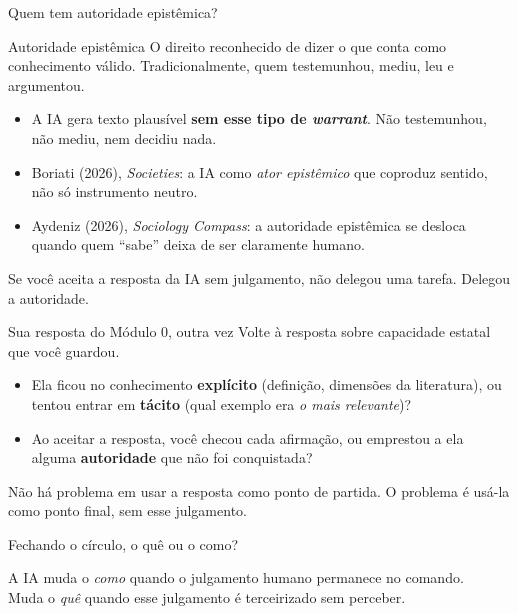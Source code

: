 \documentclass[11pt,aspectratio=169,t]{beamer}
\begin{document}
\begin{frame}{Quem tem autoridade epistêmica?}
  \footnotesize
  \begin{block}{Autoridade epistêmica}
    O direito reconhecido de dizer o que conta como conhecimento válido. Tradicionalmente, quem testemunhou, mediu, leu e argumentou.
  \end{block}
  \pause
  \vspace{0.1cm}
  \begin{itemize}
    \item A IA gera texto plausível \textbf{sem esse tipo de \textit{warrant}}. Não testemunhou, não mediu, nem decidiu nada.
    \pause
    \item Boriati (2026), \textit{Societies}: a IA como \textit{ator epistêmico} que coproduz sentido, não só instrumento neutro.
    \pause
    \item Aydeniz (2026), \textit{Sociology Compass}: a autoridade epistêmica se desloca quando quem ``sabe'' deixa de ser claramente humano.
  \end{itemize}
  \pause
  \vspace{0.1cm}
  \begin{alertblock}{}
    \centering Se você aceita a resposta da IA sem julgamento, não delegou uma tarefa. Delegou a autoridade.
  \end{alertblock}
\end{frame}

\begin{frame}{Sua resposta do Módulo 0, outra vez}
  \small
  Volte à resposta sobre capacidade estatal que você guardou.
  \begin{itemize}
    \item Ela ficou no conhecimento \textbf{explícito} (definição, dimensões da literatura), ou tentou entrar em \textbf{tácito} (qual exemplo era \textit{o mais relevante})?
    \item Ao aceitar a resposta, você checou cada afirmação, ou emprestou a ela alguma \textbf{autoridade} que não foi conquistada?
  \end{itemize}
  \pause
  \vfill
  \begin{alertblock}{}
    \centering Não há problema em usar a resposta como ponto de partida. O problema é usá-la como ponto final, sem esse julgamento.
  \end{alertblock}
\end{frame}

\begin{frame}{Fechando o círculo, o quê ou o como?}
  \begin{block}{}
    \centering\large
    A IA muda o \textit{como} quando o julgamento humano permanece no comando.\\
    Muda o \textit{quê} quando esse julgamento é terceirizado sem perceber.
  \end{block}
\end{frame}
\end{document}
